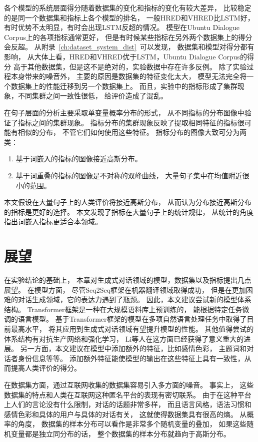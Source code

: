 各个模型的系统层面得分随着数据集的变化和指标的变化有较大差异，
比较稳定的是同一个数据集和指标上各个模型的排名，
一般HRED和VHRED比LSTM好，
有时优势不太明显，有时会出现LSTM反超的情况。
模型在Ubuntu Dialogue Corpus上的各项指标通常更好，
但是有时候某些指标在另外两个数据集上的得分会反超。
从附录~\ref{ch:dataset_system_dist}~可以发现，
数据集和模型对得分都有影响，
从大体上看，HRED和VHRED优于LSTM，Ubuntu Dialogue Corpus的得分
高于其他数据集，但是这不是绝对的，实验数据中存在许多反例。
除了实验过程本身带来的噪音外，
主要的原因是数据集的特征变化太大，
模型无法完全将一个数据集上的性能迁移到另一个数据集上。
而且，实验中的指标形成了集群现象，不同集群之间一致性很低，
给评价造成了混乱。

在句子层面的分析主要采取单变量概率分布的形式，
从不同指标的分布图像中验证了指标之间的集群现象。
指标分布的集群现象反映了提取相同特征的指标很可能有相似的分布，
不管它们如何使用这些特征。
指标分布的图像大致可分为两类：
\begin{enumerate}
    \item 基于词嵌入的指标的图像接近高斯分布。
    \item 基于词重叠的指标的图像是不对称的双峰曲线， 大量句子集中在均值附近很小的范围。
\end{enumerate}
本文假设在大量句子上的人类评价将接近高斯分布，
从而认为分布接近高斯分布的指标是更好的选择。
本文发现了指标在大量句子上的统计规律，
从统计的角度指出词嵌入指标更适合本领域。

\section{展望}\label{sec:future_work}
在实验结论的基础上，
本章对生成式对话领域的模型，数据集以及指标提出几点展望。
在模型方面， 尽管Seq2Seq框架在机器翻译领域取得成功，
但是在更加困难的对话生成领域，它的表达力遇到了瓶颈。
因此，本文建议尝试新的模型体系结构。
Transformer框架是一种在大规模语料库上预训练的，
能根据特定任务微调的语言模型。
基于Transformer框架的模型在多项自然语言处理任务中取得了目前最高水平，
将其应用到生成式对话领域有望提升模型的性能。
其他值得尝试的体系结构有对抗生产网络和强化学习，
Li等人在这方面已经获得了意义重大的进展。
另一方面，本文建议在模型中添加额外的特征，比如感情色彩，
主题词和对话者身份信息等等。
添加额外特征能使模型的输出在这些特征上具有一致性，从而提高人类评价的得分。

在数据集方面，通过互联网收集的数据集容易引入多方面的噪音。
事实上，
这些数据集的特点和人类在互联网这种匿名平台的表现有密切联系。
由于在这种平台上人们的言论没有什么限制，对话的话题非常多样，
而且语言风格，语法习惯和感情色彩和具体的用户与具体的对话有关，
这就使得数据集具有很高的熵。
从概率的角度，
数据集的样本分布可以看作是非常多个随机变量的叠加，
如果这些随机变量都是独立同分布的话，
整个数据集的样本分布就趋向于高斯分布。

